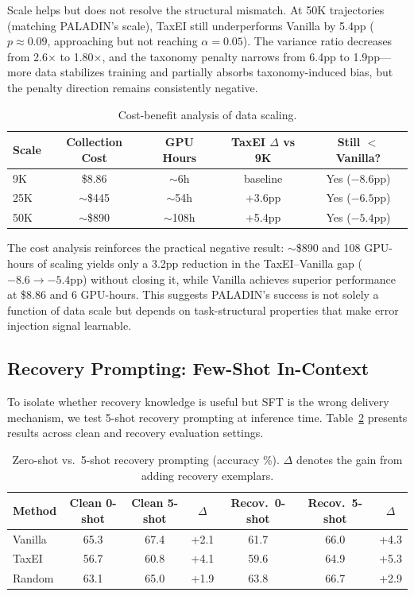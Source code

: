 \documentclass[11pt,a4paper]{article}
\begin{document}
Scale helps but does not resolve the structural mismatch. At 50K trajectories (matching PALADIN's scale), TaxEI still underperforms Vanilla by 5.4pp ($p \approx 0.09$, approaching but not reaching $\alpha = 0.05$). The variance ratio decreases from 2.6$\times$ to 1.80$\times$, and the taxonomy penalty narrows from 6.4pp to 1.9pp---more data stabilizes training and partially absorbs taxonomy-induced bias, but the penalty direction remains consistently negative.

\begin{table}[t]
\centering
\small
\caption{Cost-benefit analysis of data scaling.}
\label{tab:cost}
\begin{tabular}{lcccc}
\toprule
\textbf{Scale} & \textbf{Collection Cost} & \textbf{GPU Hours} & \textbf{TaxEI $\Delta$ vs 9K} & \textbf{Still $<$ Vanilla?} \\
\midrule
9K & \$8.86 & $\sim$6h & baseline & Yes ($-8.6$pp) \\
25K & $\sim$\$445 & $\sim$54h & +3.6pp & Yes ($-6.5$pp) \\
50K & $\sim$\$890 & $\sim$108h & +5.4pp & Yes ($-5.4$pp) \\
\bottomrule
\end{tabular}
\end{table}

The cost analysis reinforces the practical negative result: $\sim$\$890 and 108 GPU-hours of scaling yields only a 3.2pp reduction in the TaxEI--Vanilla gap ($-8.6 \rightarrow -5.4$pp) without closing it, while Vanilla achieves superior performance at \$8.86 and 6 GPU-hours. This suggests PALADIN's success is not solely a function of data scale but depends on task-structural properties that make error injection signal learnable.

\subsection{Recovery Prompting: Few-Shot In-Context}
\label{sec:fewshot}

To isolate whether recovery knowledge is useful but SFT is the wrong delivery mechanism, we test 5-shot recovery prompting at inference time. Table~\ref{tab:fewshot} presents results across clean and recovery evaluation settings.

\begin{table}[t]
\centering
\small
\caption{Zero-shot vs.\ 5-shot recovery prompting (accuracy \%). $\Delta$ denotes the gain from adding recovery exemplars.}
\label{tab:fewshot}
\begin{tabular}{lcccccc}
\toprule
\textbf{Method} & \textbf{Clean 0-shot} & \textbf{Clean 5-shot} & \textbf{$\Delta$} & \textbf{Recov.\ 0-shot} & \textbf{Recov.\ 5-shot} & \textbf{$\Delta$} \\
\midrule
Vanilla & 65.3 & 67.4 & +2.1 & 61.7 & 66.0 & +4.3 \\
TaxEI & 56.7 & 60.8 & +4.1 & 59.6 & 64.9 & +5.3 \\
Random & 63.1 & 65.0 & +1.9 & 63.8 & 66.7 & +2.9 \\
\bottomrule
\end{tabular}
\end{table}
\end{document}
